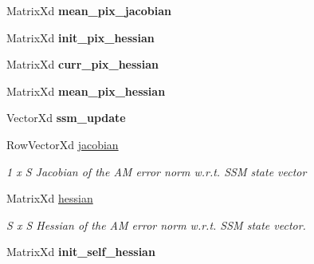 \begin{DoxyCompactItemize}
\item 
\hypertarget{classFESMBase_a54cf375ad07c991639e704dd964b9dd7}{Matrix\-Xd {\bfseries mean\-\_\-pix\-\_\-jacobian}}\label{classFESMBase_a54cf375ad07c991639e704dd964b9dd7}

\item 
\hypertarget{classFESMBase_a82cc6779a62c119303e6c238a81c9086}{Matrix\-Xd {\bfseries init\-\_\-pix\-\_\-hessian}}\label{classFESMBase_a82cc6779a62c119303e6c238a81c9086}

\item 
\hypertarget{classFESMBase_a82b55b9e1a56ef8139001ee56b0aacbf}{Matrix\-Xd {\bfseries curr\-\_\-pix\-\_\-hessian}}\label{classFESMBase_a82b55b9e1a56ef8139001ee56b0aacbf}

\item 
\hypertarget{classFESMBase_a6118749603515af235660ebcb48b8bc2}{Matrix\-Xd {\bfseries mean\-\_\-pix\-\_\-hessian}}\label{classFESMBase_a6118749603515af235660ebcb48b8bc2}

\item 
\hypertarget{classFESMBase_a9b101a654808d0eba20b501926852821}{Vector\-Xd {\bfseries ssm\-\_\-update}}\label{classFESMBase_a9b101a654808d0eba20b501926852821}

\item 
\hypertarget{classFESMBase_a393cd49f14c35b7c76b5f53e8c5ae216}{Row\-Vector\-Xd \hyperlink{classFESMBase_a393cd49f14c35b7c76b5f53e8c5ae216}{jacobian}}\label{classFESMBase_a393cd49f14c35b7c76b5f53e8c5ae216}

\begin{DoxyCompactList}\small\item\em 1 x S Jacobian of the A\-M error norm w.\-r.\-t. S\-S\-M state vector \end{DoxyCompactList}\item 
\hypertarget{classFESMBase_ab19e7ff8aab8aa8267e5b3e77ba83387}{Matrix\-Xd \hyperlink{classFESMBase_ab19e7ff8aab8aa8267e5b3e77ba83387}{hessian}}\label{classFESMBase_ab19e7ff8aab8aa8267e5b3e77ba83387}

\begin{DoxyCompactList}\small\item\em S x S Hessian of the A\-M error norm w.\-r.\-t. S\-S\-M state vector. \end{DoxyCompactList}\item 
\hypertarget{classFESMBase_ae23df79dd448c828a20be7a80ead0acc}{Matrix\-Xd {\bfseries init\-\_\-self\-\_\-hessian}}\label{classFESMBase_ae23df79dd448c828a20be7a80ead0acc}

\end{DoxyCompactItemize}
